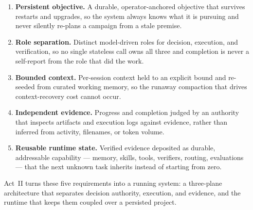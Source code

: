 \begin{enumerate}[leftmargin=1.5em, label=\textbf{R\arabic*.}]
  \item \textbf{Persistent objective.} A durable, operator-anchored objective that
    survives restarts and upgrades, so the system always knows what it is pursuing
    and never silently re-plans a campaign from a stale premise.
  \item \textbf{Role separation.} Distinct model-driven roles for decision,
    execution, and verification, so no single stateless call owns all three and
    completion is never a self-report from the role that did the work.
  \item \textbf{Bounded context.} Per-session context held to an explicit bound and
    re-seeded from curated working memory, so the runaway compaction that drives
    context-recovery cost cannot occur.
  \item \textbf{Independent evidence.} Progress and completion judged by an
    authority that inspects artifacts and execution logs against evidence, rather
    than inferred from activity, filenames, or token volume.
  \item \textbf{Reusable runtime state.} Verified evidence deposited as durable,
    addressable capability --- memory, skills, tools, verifiers, routing,
    evaluations --- that the next unknown task inherits instead of starting from
    zero.
\end{enumerate}

Act~II turns these five requirements into a running system: a three-plane
architecture that separates decision authority, execution, and evidence, and the
runtime that keeps them coupled over a persisted project.
